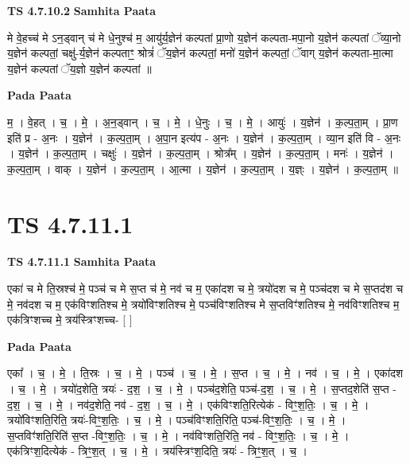 \documentclass[17pt]{extarticle}
\begin{document}
\textbf{TS 4.7.10.2 } \newline
\textbf{Samhita Paata} \newline

मे वे॒हच्च॑ मे ऽन॒ड्वान् च॑ मे धे॒नुश्च॑ म॒ आयु॑र्य॒ज्ञेन॑ कल्पतां प्रा॒णो य॒ज्ञेन॑ कल्पता-मपा॒नो य॒ज्ञेन॑ कल्पतां ॅव्या॒नो य॒ज्ञेन॑ कल्पतां॒ चक्षु॑-र्य॒ज्ञेन॑ कल्पताꣳ॒॒ श्रोत्रं॑ ॅय॒ज्ञेन॑ कल्पतां॒ मनो॑ य॒ज्ञेन॑ कल्पतां॒ ॅवाग् य॒ज्ञेन॑ कल्पता-मा॒त्मा य॒ज्ञेन॑ कल्पतां ॅय॒ज्ञो य॒ज्ञेन॑ कल्पतां ॥ \newline

\textbf{Pada Paata} \newline

म॒ । वे॒हत् । च॒ । मे॒ । अ॒न॒ड्वान् । च॒ । मे॒ । धे॒नुः । च॒ । मे॒ । आयुः॑ । य॒ज्ञेन॑ । क॒ल्प॒ता॒म् । प्रा॒ण इति॑ प्र - अ॒नः । य॒ज्ञेन॑ । क॒ल्प॒ता॒म् । अ॒पा॒न इत्य॑प - अ॒नः । य॒ज्ञेन॑ । क॒ल्प॒ता॒म् । व्या॒न इति॑ वि - अ॒नः । य॒ज्ञेन॑ । क॒ल्प॒ता॒म् । चक्षुः॑ । य॒ज्ञेन॑ । क॒ल्प॒ता॒म् । श्रोत्र᳚म् । य॒ज्ञेन॑ । क॒ल्प॒ता॒म् । मनः॑ । य॒ज्ञेन॑ । क॒ल्प॒ता॒म् । वाक् । य॒ज्ञेन॑ । क॒ल्प॒ता॒म् । आ॒त्मा । य॒ज्ञेन॑ । क॒ल्प॒ता॒म् । य॒ज्ञ्ः । य॒ज्ञेन॑ । क॒ल्प॒ता॒म् ॥  \newline




\section*{ TS 4.7.11.1 }

\textbf{TS 4.7.11.1 } \newline
\textbf{Samhita Paata} \newline

एका॑ च मे ति॒स्रश्च॑ मे॒ पञ्च॑ च मे स॒प्त च॑ मे॒ नव॑ च म॒ एका॑दश च मे॒ त्रयो॑दश च मे॒ पञ्च॑दश च मे स॒प्तद॑श च मे॒ नव॑दश च म॒ एक॑विꣳशतिश्च मे॒ त्रयो॑विꣳशतिश्च मे॒ पञ्च॑विꣳशतिश्च मे स॒प्तविꣳ॑शतिश्च मे॒ नव॑विꣳशतिश्च म॒ एक॑त्रिꣳशच्च मे॒ त्रय॑स्त्रिꣳशच्च- [  ] \newline

\textbf{Pada Paata} \newline

एका᳚ । च॒ । मे॒ । ति॒स्रः । च॒ । मे॒ । पञ्च॑ । च॒ । मे॒ । स॒प्त । च॒ । मे॒ । नव॑ । च॒ । मे॒ । एका॑दश । च॒ । मे॒ । त्रयो॑द॒शेति॒ त्रयः॑ - द॒श॒ । च॒ । मे॒ । पञ्च॑द॒शेति॒ पञ्च॑-द॒श॒ । च॒ । मे॒ । स॒प्तद॒शेति॑ स॒प्त - द॒श॒ । च॒ । मे॒ । नव॑द॒शेति॒ नव॑ - द॒श॒ । च॒ । मे॒ । एक॑विꣳशति॒रित्येक॑ - विꣳ॒॒श॒तिः॒ । च॒ । मे॒ । त्रयो॑विꣳशति॒रिति॒ त्रयः॑-विꣳ॒॒श॒तिः॒ । च॒ । मे॒ । पञ्च॑विꣳशति॒रिति॒ पञ्च॑-विꣳ॒॒श॒तिः॒ । च॒ । मे॒ । स॒प्तविꣳ॑शति॒रिति॑ स॒प्त -विꣳ॒॒श॒तिः॒ । च॒ । मे॒ । नव॑विꣳशति॒रिति॒ नव॑ - विꣳ॒॒श॒तिः॒ । च॒ । मे॒ । एक॑त्रिꣳश॒दित्येक॑ - त्रिꣳ॒॒श॒त् । च॒ । मे॒ । त्रय॑स्त्रिꣳश॒दिति॒ त्रयः॑ - त्रिꣳ॒॒श॒त् । च॒ ।  \newline
\end{document}
